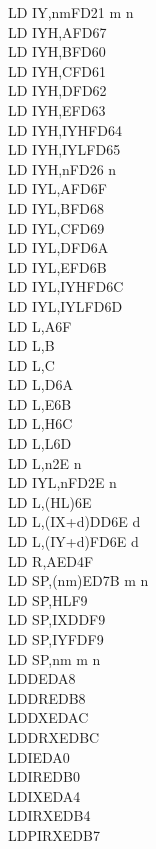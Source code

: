 \begin{multicols}{3}
{\begin{tabbing}
		LD IY,nm\>FD21 m n\\
		LD IYH,A\UNDOC\>FD67\\
		LD IYH,B\UNDOC\>FD60\\
		LD IYH,C\UNDOC\>FD61\\
		LD IYH,D\UNDOC\>FD62\\
		LD IYH,E\UNDOC\>FD63\\
		LD IYH,IYH\UNDOC\>FD64\\
		LD IYH,IYL\UNDOC\>FD65\\
		LD IYH,n\UNDOC\>FD26 n\\
		LD IYL,A\UNDOC\>FD6F\\
		LD IYL,B\UNDOC\>FD68\\
		LD IYL,C\UNDOC\>FD69\\
		LD IYL,D\UNDOC\>FD6A\\
		LD IYL,E\UNDOC\>FD6B\\
		LD IYL,IYH\UNDOC\>FD6C\\
		LD IYL,IYL\UNDOC\>FD6D\\
		LD L,A\>6F\\
		LD L,B\\
		LD L,C\\
		LD L,D\>6A\\
		LD L,E\>6B\\
		LD L,H\>6C\\
		LD L,L\>6D\\
		LD L,n\>2E n\\
		LD IYL,n\UNDOC\>FD2E n\\
		LD L,(HL)\>6E\\
		LD L,(IX+d)\>DD6E d\\
		LD L,(IY+d)\>FD6E d\\
		LD R,A\>ED4F\\
		LD SP,(nm)\>ED7B m n\\
		LD SP,HL\>F9\\
		LD SP,IX\>DDF9\\
		LD SP,IY\>FDF9\\
		LD SP,nm m n\\
		LDD\>EDA8\\
		LDDR\>EDB8\\
		LDDX\ZXN\>EDAC\\
		LDDRX\ZXN\>EDBC\\
		LDI\>EDA0\\
		LDIR\>EDB0\\
		LDIX\ZXN\>EDA4\\
		LDIRX\ZXN\>EDB4\\
		LDPIRX\ZXN\>EDB7\\

\end{tabbing}}
\end{multicols}
